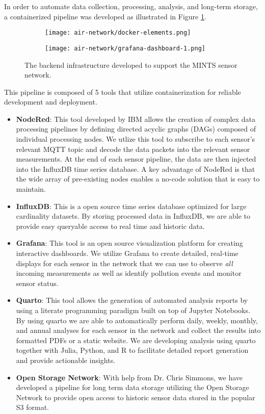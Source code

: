 In order to automate data collection, processing, analysis, and long-term storage, a containerized pipeline was developed as illustrated in Figure \ref{fig:dashboards}.
\begin{figure}[!hbt]
  \begin{subfigure}{.2\textwidth}
    \centering
    \texttt{[image: air-network/docker-elements.png]}
    \caption{}
  \end{subfigure}
  \begin{subfigure}{.8\textwidth}
    \centering
    \texttt{[image: air-network/grafana-dashboard-1.png]}
    \caption{}
  \end{subfigure}
  \caption{The backend infrastructure developed to support the MINTS sensor network.}
  \label{fig:dashboards}
\end{figure}
This pipeline is composed of 5 tools that utilize containerization for reliable development and deployment.
\begin{itemize}
\item \textbf{NodeRed}: This tool developed by IBM allows the creation of complex data processing pipelines by defining directed acyclic graphs (DAGs) composed of individual processing nodes. We utlize this tool to subscribe to each sensor's relevant MQTT topic and decode the data packets into the relevant sensor measurements. At the end of each sensor pipeline, the data are then injected into the InfluxDB time series database. A key advantage of NodeRed is that the wide array of pre-existing nodes enables a no-code solution that is easy to maintain.
\item \textbf{InfluxDB}: This is a open source time series database optimized for large cardinality datasets. By storing processed data in InfluxDB, we are able to provide easy queryable access to real time and historic data.
\item \textbf{Grafana}: This tool is an open source visualization platform for creating interactive dashboards. We utilize Grafana to create detailed, real-time displays for each sensor in the network that we can use to observe \textit{all} incoming measurements as well as identify pollution events and monitor sensor status.
\item \textbf{Quarto}: This tool allows the generation of automated analysis reports by using a literate programming paradigm built on top of Jupyter Notebooks. By using quarto we are able to automatically perform daily, weekly, monthly, and annual analyses for each sensor in the network and collect the results into formatted PDFs or a static website. We are developing analysis using quarto together with Julia, Python, and R to facilitate detailed report generation and provide actionable insights.
\item \textbf{Open Storage Network}: With help from Dr. Chris Simmons, we have developed a pipeline for long term data storage utilizing the Open Storage Network to provide open access to historic sensor data stored in the popular S3 format.
\end{itemize}
